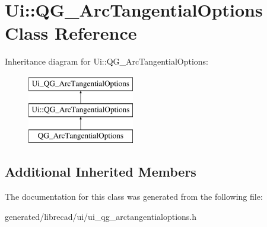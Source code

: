 \hypertarget{classUi_1_1QG__ArcTangentialOptions}{\section{Ui\-:\-:Q\-G\-\_\-\-Arc\-Tangential\-Options Class Reference}
\label{classUi_1_1QG__ArcTangentialOptions}
}
Inheritance diagram for Ui\-:\-:Q\-G\-\_\-\-Arc\-Tangential\-Options\-:\begin{figure}[H]
\begin{center}
\leavevmode
\includegraphics[height=3.000000cm]{classUi_1_1QG__ArcTangentialOptions}
\end{center}
\end{figure}
\subsection*{Additional Inherited Members}


The documentation for this class was generated from the following file\-:\begin{DoxyCompactItemize}
\item 
generated/librecad/ui/ui\-\_\-qg\-\_\-arctangentialoptions.\-h\end{DoxyCompactItemize}
